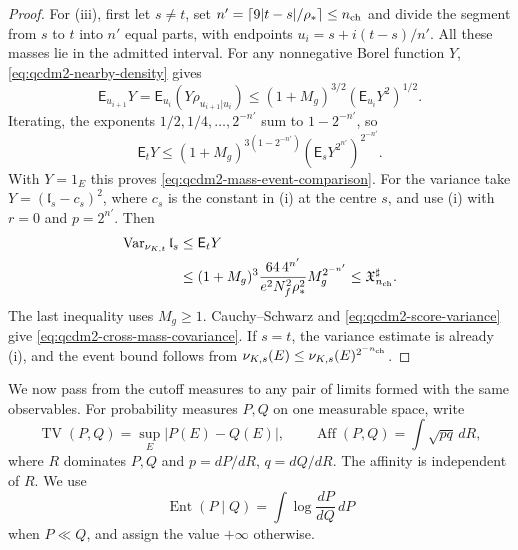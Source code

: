 \documentclass[11pt,letterpaper,reqno]{amsart}
\theoremstyle{definition}
\theoremstyle{remark}
\begin{document}
\begin{proof}
For (iii), first let $s\ne t$, set
$n'=\lceil9|t-s|/\rho_*\rceil\le n_{\rm ch}$ and divide
the segment from $s$ to $t$ into $n'$ equal parts, with
endpoints $u_i=s+i(t-s)/n'$. All these masses lie in the
admitted interval. For any nonnegative Borel function $Y$,
\eqref{eq:qcdm2-nearby-density} gives
\[
 \mathsf E_{u_{i+1}}Y
 =\mathsf E_{u_i}(Y\rho_{u_{i+1}|u_i})
 \le(1+M_g)^{3/2}(\mathsf E_{u_i}Y^2)^{1/2}.
\]
Iterating, the exponents $1/2,1/4,\ldots,2^{-n'}$ sum
to $1-2^{-n'}$, so
\begin{equation}\label{eq:qcdm2-mass-chain}
 \mathsf E_tY\le(1+M_g)^{3(1-2^{-n'})}
                        (\mathsf E_sY^{2^{n'}})^{2^{-n'}}.
\end{equation}
With $Y=1_E$ this proves \eqref{eq:qcdm2-mass-event-comparison}.
For the variance take $Y=(\mathfrak l_s-c_s)^2$, where
$c_s$ is the constant in (i) at the centre $s$, and use
(i) with $r=0$ and $p=2^{n'}$. Then
\[
 \begin{split}
 \operatorname{Var}_{\nu_{K,t}}\mathfrak l_s
 &\le\mathsf E_tY\\
 &\le(1+M_g)^3
       \frac{64\,4^{n'}}{e^2N_f^2\rho_*^2}M_g^{2^{-n'}}
 \le\mathfrak X_{n_{\rm ch}}^\sharp.
 \end{split}
\]
The last inequality uses $M_g\ge1$. Cauchy--Schwarz and
\eqref{eq:qcdm2-score-variance} give
\eqref{eq:qcdm2-cross-mass-covariance}. If $s=t$, the
variance estimate is already (i), and the event bound follows
from $\nu_{K,s}(E)\le\nu_{K,s}(E)^{2^{-n_{\rm ch}}}$.
\end{proof}

We now pass from the cutoff measures to any pair of limits
formed with the same observables. For probability measures
$P,Q$ on one measurable space, write
\[
 \operatorname{TV}(P,Q)=\sup_E|P(E)-Q(E)|,
 \qquad
 \operatorname{Aff}(P,Q)=\int\sqrt{pq}\,dR,
\]
where $R$ dominates $P,Q$ and $p=dP/dR$, $q=dQ/dR$.
The affinity is independent of $R$. We use
\[
 \operatorname{Ent}(P\mid Q)
   =\int\log\frac{dP}{dQ}\,dP
\]
when $P\ll Q$, and assign the value $+\infty$ otherwise.
\end{document}
